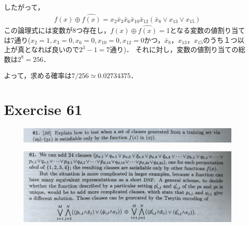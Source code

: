 \documentclass[dvipdfmx,a4paper,12pt]{jsarticle}
\begin{document}
 したがって，
 \begin{gather*}
f(x) \oplus \hat{f(x)} =  x_{2}\bar{x}_{3}\bar{x}_{6}\bar{x}_{10}\bar{x}_{12}(\bar{x}_{8} \lor x_{13} \lor x_{15})
\end{gather*}  
この論理式には変数が8つ存在し，$f(x) \oplus \hat{f(x)} = 1$となる変数の値割り当ては7通り($x_{2}=1,x_{3}=0,x_{6}=0,x_{10}=0,x_{12}=0$かつ，$\bar{x}_{8}，x_{13}，x_{15}$のうち１つ以上が真となれば良いので$2^3-1=7$通り)．
それに対し，変数の値割り当ての総数は$2^8=256$．

よって，求める確率は$7/256 \simeq 0.02734375$．
 
  
\section*{Exercise 61}
 \begin{figure}[htbp]
  \centering
  \includegraphics[width=142mm,angle=0]{images/61.jpg}
  \end{figure}

 \begin{figure}[htbp]
  \centering
  \includegraphics[width=142mm,angle=0]{images/61a.jpg}
  \end{figure}

  
\end{document}
